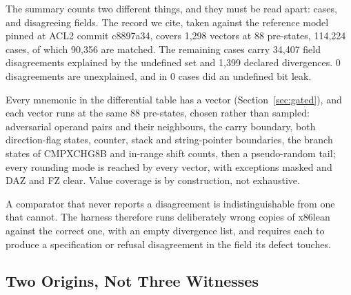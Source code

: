 \documentclass[runningheads]{llncs}
\newcommand{\src}[1]{}  %
\begin{document}
The summary counts two different things, and they must be read apart: cases, and disagreeing fields.
The record we cite, taken against the reference model pinned at ACL2 commit c8897a34, covers
1{,}298 vectors at 88 pre-states, 114{,}224 cases, of which 90{,}356 are
matched. The remaining cases carry 34{,}407 field disagreements explained by the undefined set and 1{,}399
declared divergences. 0 disagreements are unexplained, and in 0 cases did an undefined bit leak.
\src{docs/DIFFERENTIAL-P2-BATCH49.md at the pin 6a12679, the RUN block's main table; docs/CLAIMS.tsv[diff\_vectors, diff\_prestates, diff\_cases,
diff\_matched, diff\_explained, diff\_diverged, diff\_unexplained, diff\_leaks]. Units: Main.lean
compareRecs counts cases, matched and leaks per case, and the other three per field}
Every mnemonic in the differential table has a vector (Section~\ref{sec:gated}), and each vector runs at the same 88
pre-states, chosen rather than sampled: adversarial operand pairs and their neighbours, the carry
boundary, both direction-flag states, counter, stack and string-pointer boundaries, the branch states
of CMPXCHG8B and in-range shift counts, then a pseudo-random tail; every rounding mode is reached by
every vector, with exceptions masked and DAZ and FZ clear. Value coverage is by construction, not
exhaustive.
\src{Tests/Coverage.lean vectorCoverage (per table row) and silicon\_rows\_are\_not\_differential\_rows; Tests/Vectors.lean preStates and mxcsrFor, their docstrings}
A comparator that never reports a disagreement is indistinguishable from one that cannot. The harness
therefore runs deliberately wrong copies of x86lean against the correct one, with an empty divergence
list, and requires each to produce a specification or refusal disagreement in the field its defect
touches.
\src{Main.lean driveWrong: compareRecs [] good bad; hits exclude undefined-region and harness}

\subsection{Two Origins, Not Three Witnesses}
\label{sec:validation:origins}
\end{document}
